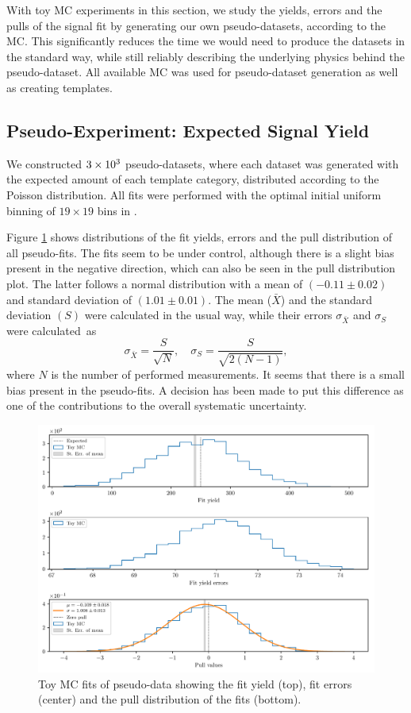 With toy MC experiments in this section, we study the yields, errors and the pulls of the signal fit by generating our own pseudo-datasets, according to the MC. This significantly reduces the time we would need to produce the datasets in the standard way, while still reliably describing the underlying physics behind the pseudo-dataset. All available MC was used for pseudo-dataset generation as well as creating templates. 

\subsection{Pseudo-Experiment: Expected Signal Yield}

We constructed $3\times 10^{3}$ pseudo-datasets, where each dataset was generated with the expected amount of each template category, distributed according to the Poisson distribution. All fits were performed with the optimal initial uniform binning of $19 \times 19$ bins in \vars.

Figure \ref{fig:toyMC} shows distributions of the fit yields, errors and the pull distribution of all pseudo-fits. The fits seem to be under control, although there is a slight bias present in the negative direction, which can also be seen in the pull distribution plot. The latter follows a normal distribution with a mean of $(-0.11\pm0.02)$ and standard deviation of $(1.01\pm0.01)$. The mean ($\bar X$) and the standard deviation $(S)$ were calculated in the usual way, while their errors $\sigma_{\bar X}$ and $\sigma_S$ were calculated~as~\cite{ahn2003standard}
\begin{equation}
\sigma_{\bar X} = \frac{S}{\sqrt{N}},\quad \sigma_{S} = \frac{S}{\sqrt{2(N-1)}},
\end{equation}
where $N$ is the number of performed measurements. It seems that there is a small bias present in the pseudo-fits. A decision has been made to put this difference as one of the contributions to the overall systematic uncertainty.

\begin{figure}[H]
	\centering
	\captionsetup{width=0.8\linewidth}
	\includegraphics[width=\linewidth]{fig/toyMC}
	\caption{Toy MC fits of pseudo-data showing the fit yield (top), fit errors (center) and the pull distribution of the fits (bottom).}
	\label{fig:toyMC}
\end{figure}

